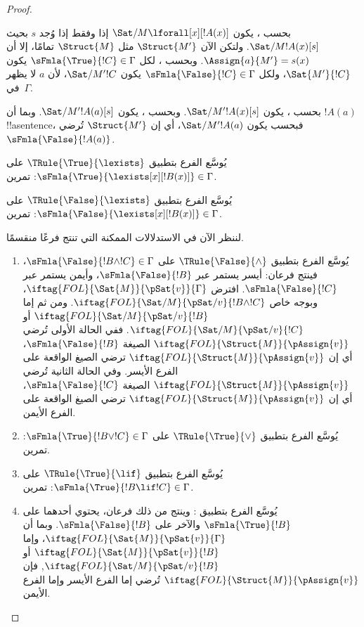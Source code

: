 \documentclass[../../../include/open-logic-section]{subfiles}
\begin{document}
\begin{proof}
\begin{enumerate}
{  بحسب ، يكون
  $\Sat/{M}{\lforall[x][!A(x)]}$ إذا وفقط إذا وُجد $s$ بحيث
  $\Sat/{M}{!A(x)}[s]$. ولتكن الآن $\Struct{M'}$ مثل
  $\Struct{M}$ تمامًا، إلا أن $\Assign{a}{M'} = s(x)$. وبحسب
  ، لكل
  $\sFmla{\True}{!C} \in \Gamma$ يكون $\Sat{M'}{!C}$، ولكل
  $\sFmla{\False}{!C} \in \Gamma$ يكون $\Sat/{M'}{!C}$، لأن $a$ لا
  يظهر في~$\Gamma$.

  بحسب ، يكون
  $\Sat/{M'}{!A(x)}[s]$. وبحسب ،
  يكون $\Sat/{M'}{!A(a)}[s]$. وبما أن $!A(a)$ !!a{sentence}، فبحسب
   يكون $\Sat/{M'}{!A(a)}$،
  أي إن $\Struct{M'}$ تُرضي $\sFmla{\False}{!A(a)}$.
\item يُوسَّع الفرع بتطبيق $\TRule{\True}{\lexists}$ على
  $\sFmla{\True}{\lexists[x][!B(x)]} \in \Gamma$: تمرين.
\item يُوسَّع الفرع بتطبيق $\TRule{\False}{\lexists}$ على
  $\sFmla{\False}{\lexists[x][!B(x)]} \in \Gamma$: تمرين.}{}
\end{enumerate}
لننظر الآن في الاستدلالات الممكنة التي تنتج فرعًا منقسمًا.
\begin{enumerate}
\item يُوسَّع الفرع بتطبيق $\TRule{\False}{\land}$ على
  $\sFmla{\False}{!B \land !C} \in \Gamma$، فينتج فرعان: أيسر يستمر
  عبر $\sFmla{\False}{!B}$، وأيمن يستمر عبر $\sFmla{\False}{!C}$. افترض
  $\iftag{FOL}{\Sat{M}}{\pSat{v}}{\Gamma}$، وبوجه خاص
  $\iftag{FOL}{\Sat/{M}}{\pSat/{v}}{!B \land !C}$. ومن ثم إما
  $\iftag{FOL}{\Sat/{M}}{\pSat/{v}}{!B}$ أو
  $\iftag{FOL}{\Sat/{M}}{\pSat/{v}}{!C}$. ففي الحالة الأولى تُرضي
  $\iftag{FOL}{\Struct{M}}{\pAssign{v}}$ الصيغة
  $\sFmla{\False}{!B}$، أي إن $\iftag{FOL}{\Struct{M}}{\pAssign{v}}$
  ترضي الصيغ الواقعة على الفرع الأيسر. وفي الحالة الثانية تُرضي
  $\iftag{FOL}{\Struct{M}}{\pAssign{v}}$ الصيغة
  $\sFmla{\False}{!C}$، أي إن $\iftag{FOL}{\Struct{M}}{\pAssign{v}}$
  ترضي الصيغ الواقعة على الفرع الأيمن.
\item يُوسَّع الفرع بتطبيق $\TRule{\True}{\lor}$ على
  $\sFmla{\True}{!B \lor !C} \in \Gamma$: تمرين.
\item يُوسَّع الفرع بتطبيق $\TRule{\True}{\lif}$ على
  $\sFmla{\True}{!B \lif !C} \in \Gamma$: تمرين.
\item يُوسَّع الفرع بتطبيق \Cut: وينتج من ذلك فرعان، يحتوي أحدهما على
  $\sFmla{\True}{!B}$ والآخر على $\sFmla{\False}{!B}$. وبما أن
  $\iftag{FOL}{\Sat{M}}{\pSat{v}}{\Gamma}$، وإما
  $\iftag{FOL}{\Sat{M}}{\pSat{v}}{!B}$ أو
  $\iftag{FOL}{\Sat/{M}}{\pSat/{v}}{!B}$,
  فإن $\iftag{FOL}{\Struct{M}}{\pAssign{v}}$ تُرضي إما الفرع الأيسر
  وإما الفرع الأيمن.
\end{enumerate}
\end{proof}
\end{document}
